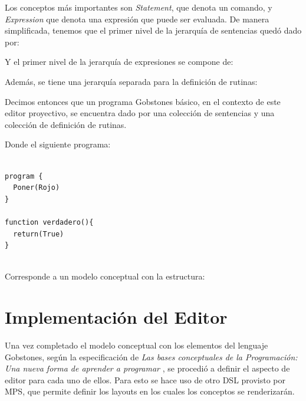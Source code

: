 Los conceptos más importantes son \textit{Statement}, que denota un comando, y \textit{Expression} que denota una expresión que puede ser evaluada. De manera simplificada, tenemos que el primer nivel de la jerarquía de sentencias quedó dado por:

\centertree{
  [Statement 
      [Alternative ]
      [Loop]
      [Procedure]
      [Assignment]
  ]
}

\bigskip

Y el primer nivel de la jerarquía de expresiones se compone de:

\centertree{
  [Expression 
      [BinaryOperation]
      [Value]
      [Function]
  ]
}

\bigskip

Además, se tiene una jerarquía separada para la definición de rutinas:

\centertree{
  [RoutineDeclaration 
    [ProcedureDeclaration] 
    [FunctionDeclaration]
  ]
}


Decimos entonces que un programa Gobstones básico, en el contexto de este editor proyectivo, se encuentra dado por una colección de sentencias y una colección de definición de rutinas.

Donde el siguiente programa:

\begin{lstlisting}[frame=single] 

program {
  Poner(Rojo)
}

function verdadero(){
  return(True)
}
    
\end{lstlisting}

Corresponde a un modelo conceptual con la estructura:



\section{Implementación del Editor}\label{editor}

Una vez completado el modelo conceptual con los elementos del lenguaje Gobstones, según la especificación de \textit{Las bases conceptuales de la Programación: Una nueva forma de aprender a programar} \cite{Gobstones}, se procedió a definir el aspecto de editor para cada uno de ellos. Para esto se hace uso de otro DSL provisto por MPS, que permite definir los layouts en los cuales los conceptos se renderizarán.

